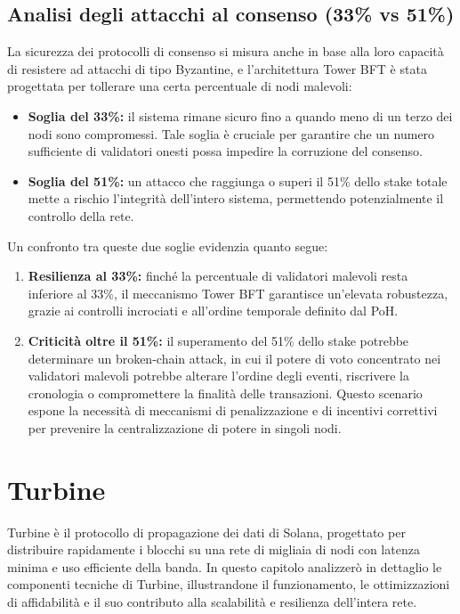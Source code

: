 \documentclass[a4paper,12pt]{report}
\begin{document}
	\subsection{Analisi degli attacchi al consenso (33\% vs 51\%)}
	La sicurezza dei protocolli di consenso si misura anche in base alla loro capacità di resistere ad attacchi di tipo Byzantine, e l’architettura Tower BFT è stata progettata per tollerare una certa percentuale di nodi malevoli:
	\begin{itemize}
		\item \textbf{Soglia del 33\%:} il sistema rimane sicuro fino a quando meno di un terzo dei nodi sono compromessi. Tale soglia è cruciale per garantire che un numero sufficiente di validatori onesti possa impedire la corruzione del consenso.
		\item \textbf{Soglia del 51\%:} un attacco che raggiunga o superi il 51\% dello stake totale mette a rischio l’integrità dell’intero sistema, permettendo potenzialmente il controllo della rete.
	\end{itemize}
	Un confronto tra queste due soglie evidenzia quanto segue:
	\begin{enumerate}
		\item \textbf{Resilienza al 33\%:} finché la percentuale di validatori malevoli resta inferiore al 33\%, il meccanismo Tower BFT garantisce un’elevata robustezza, grazie ai controlli incrociati e all’ordine temporale definito dal PoH.
		\item \textbf{Criticità oltre il 51\%:} il superamento del 51\% dello stake potrebbe determinare un broken-chain attack, in cui il potere di voto concentrato nei validatori malevoli potrebbe alterare l’ordine degli eventi, riscrivere la cronologia o compromettere la finalità delle transazioni. Questo scenario espone la necessità di meccanismi di penalizzazione e di incentivi correttivi per prevenire la centralizzazione di potere in singoli nodi.
	\end{enumerate}
	
	\section{Turbine}
	
	Turbine è il protocollo di propagazione dei dati di Solana, progettato per distribuire rapidamente i blocchi su una rete di migliaia di nodi con latenza minima e uso efficiente della banda. In questo capitolo analizzerò in dettaglio le componenti tecniche di Turbine, illustrandone il funzionamento, le ottimizzazioni di affidabilità e il suo contributo alla scalabilità e resilienza dell'intera rete.
	
\end{document}

